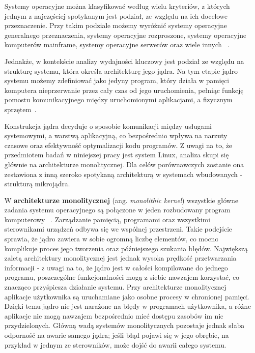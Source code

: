 Systemy operacyjne można klasyfikować według wielu kryteriów, z których jednym z najczęściej spotykanym jest podział, ze względu na ich docelowe przeznaczenie. Przy takim podziale możemy wyróżnić systemy operacyjne generalnego przeznaczenia, systemy operacyjne rozproszone, systemy operacyjne komputerów mainframe, systemy operacyjne serwerów oraz wiele innych ~\cite{Tanenbaum}.

Jednakże, w kontekście analizy wydajności kluczowy jest podział ze względu na strukturę systemu, która określa architekturę jego jądra.  Na tym etapie jądro systemu możemy zdefiniować jako jedyny program, który działa w pamięci komputera nieprzerwanie przez cały czas od jego uruchomienia, pełniąc funkcję pomostu komunikacyjnego między uruchomionymi aplikacjami,
a fizycznym sprzętem~\cite{Abraham_Silberschatz}.

Konstrukcja jądra decyduje o sposobie komunikacji między usługami systemowymi, a warstwą aplikacyjną, co bezpośrednio wpływa na narzuty czasowe oraz efektywność optymalizacji kodu programów. 
Z uwagi na to, że przedmiotem badań w niniejszej pracy jest system Linux, analiza skupi się głównie na architekturze monolitycznej. Dla celów porównawczych zostanie ona zestawiona z inną szeroko spotykaną architekturą w systemach wbudowanych - strukturą mikrojądra.

W \textbf{architekturze monolitycznej} (ang. \textit{monolithic kernel}) wszystkie główne zadania systemu operacyjnego są połączone w jeden rozbudowany program komputerowy ~\cite{Tanenbaum}. Zarządzanie pamięcią, programami oraz wszystkimi sterownikami urządzeń odbywa się we wspólnej przestrzeni.
Takie podejście sprawia, że jądro zawiera w sobie ogromną liczbę elementów, co mocno komplikuje proces jego tworzenia oraz późniejszego szukania błędów. Największą zaletą architektury monolitycznej jest jednak wysoka prędkość przetwarzania informacji - z uwagi na to, że 
jądro jest w całości kompilowane do jednego programu, poszczególne funkcjonalności mogą z siebie nawzajem korzystać, co znacząco przyśpiesza działanie systemu. 
Przy architekturze monolitycznej aplikacje użytkownika są uruchamiane jako osobne procesy w chronionej pamięci. Dzięki temu jądro nie jest narażone na błędy w programach użytkownika, a różne aplikacje nie mogą nawzajem bezpośrednio mieć dostępu zasobów im nie przydzielonych.
Główną wadą systemów monolitycznych pozostaje jednak słaba odporność na awarie samego jądra; jeśli błąd pojawi się w jego obrębie, na przykład w jednym ze sterowników, może dojść do awarii całego systemu.

